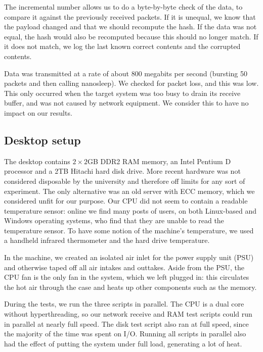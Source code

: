 \documentclass[conference]{IEEEtran}
\begin{document}
The incremental number allows us to do a byte-by-byte check of the data, to
compare it against the previously received packets. If it is unequal, we know
that the payload changed and that we should recompute the hash. If the data was
not equal, the hash would also be recomputed because this should no longer
match. If it does not match, we log the last known correct contents and the
corrupted contents.

Data was transmitted at a rate of about 800 megabits per second (bursting 50
packets and then calling nanosleep). We checked for packet loss, and this was
low. This only occurred when the target system was too busy to drain its
receive buffer, and was not caused by network equipment. We consider this to
have no impact on our results.


\subsection{Desktop setup}

The desktop contains $2\times2$GB DDR2 RAM memory, an Intel Pentium D processor
and a 2TB Hitachi hard disk drive. More recent hardware was not considered
disposable by the university and therefore off limits for any sort of
experiment. The only alternative was an old server with ECC memory, which we
considered unfit for our purpose. Our CPU did not seem to contain a readable
temperature sensor: online we find many posts of users, on both Linux-based and
Windows operating systems, who find that they are unable to read the
temperature sensor. To have some notion of the machine's temperature, we used a
handheld infrared thermometer and the hard drive temperature.

In the machine, we created an isolated air inlet for the power supply unit
(PSU) and otherwise taped off all air intakes and outtakes. Aside from the PSU,
the CPU fan is the only fan in the system, which we left plugged in: this
circulates the hot air through the case and heats up other components such as
the memory.

During the tests, we run the three scripts in parallel. The CPU is a dual core
without hyperthreading, so our network receive and RAM test scripts could run
in parallel at nearly full speed. The disk test script also ran at full speed,
since the majority of the time was spent on I/O. Running all scripts in
parallel also had the effect of putting the system under full load, generating
a lot of heat.
\end{document}
